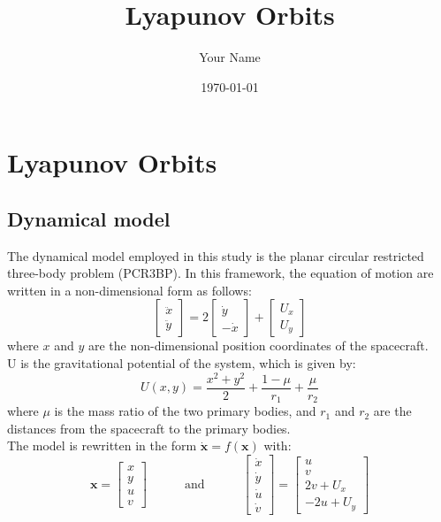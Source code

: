 \documentclass{report}
\title{#1}
\author{#2}
\date{#3}
\newcommand{\report}[3]{
    \title{#1}
    \author{#2}
    \date{#3}
    \maketitle
}
\begin{document}
\report{Lyapunov Orbits}{Your Name}{\today}


\newpage

\section{Lyapunov Orbits}
\subsection{Dynamical model}
The dynamical model employed in this study is the planar circular restricted three-body problem (PCR3BP).
In this framework, the equation of motion are written in a non-dimensional form as follows:
\begin{equation}
    \begin{bmatrix}
        \ddot{x} \\
        \ddot{y}
    \end{bmatrix}
    = 2
    \begin{bmatrix}
        \dot{y} \\
        -\dot{x}
    \end{bmatrix}
    +
    \begin{bmatrix}
        U_x \\
        U_y
    \end{bmatrix}
\end{equation}
where $x$ and $y$ are the non-dimensional position coordinates of the spacecraft.\\
U is the gravitational potential of the system, which is given by:
\begin{equation}
    U(x,y) = \frac{x^2 + y^2}{2} + \frac{1-\mu}{r_1} + \frac{\mu}{r_2}
\end{equation}
where $\mu$ is the mass ratio of the two primary bodies, and $r_1$ and $r_2$ are the distances from the spacecraft to the primary bodies.\\
The model is rewritten in the form $\dot{\boldsymbol{x}} = f(\boldsymbol{x})$ with:
\begin{equation}
    \boldsymbol{x} = 
    \begin{bmatrix}
        x \\
        y \\
        u \\
        v
    \end{bmatrix}  \quad \quad \quad \text{and} \quad \quad \quad 
    \begin{bmatrix}
        \dot{x} \\
        \dot{y} \\
        \dot{u} \\
        \dot{v}
    \end{bmatrix}
    =
    \begin{bmatrix}
        u \\
        v \\
        2v + U_x \\
        -2u + U_y
    \end{bmatrix}
\end{equation}
\end{document}

